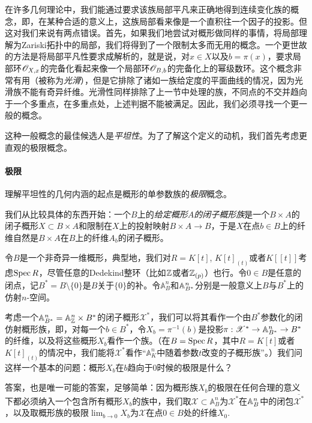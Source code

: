 在许多几何理论中，我们能通过要求该族局部平凡来正确地得到连续变化族的概念，即，在某种合适的意义上，这族局部看来像是一个直积往一个因子的投影。但这对我们来说有两点错误。首先，如果我们\naive 地尝试对概形做同样的事情，将局部理解为Zariski拓扑中的局部，我们将得到了一个限制太多而无用的概念。一个更世故的方法是将局部平凡性要求成解析的，就是说，对$x\in X$以及$b=\pi(x)$，要求局部环$\mathscr{O}_{X,x}$的完备化看起来像一个局部环$\mathscr{O}_{B,b}$的完备化上的幂级数环。这个概念非常有用（被称为\textit{光滑}），但是它排除了诸如一族给定度的平面曲线的情况，因为光滑族不能有奇异纤维。光滑性同样排除了上一节中处理的族，不同点的不交并趋向于一个多重点，在多重点处，上述判据不能被满足。因此，我们必须寻找一个更一般的概念。

这种一般概念的最佳候选人是\textit{平坦性}。为了了解这个定义的动机，我们首先考虑更直观的极限概念。

\paragraph*{极限}
理解平坦性的几何内涵的起点是概形的单参数族的\textit{极限}概念。

我们从比较具体的东西开始：一个$B$上的\textit{给定概形$A$的闭子概形族}是一个$B\times A$的闭子概形$X\subset B\times A$和限制在$X$上的投射映射$B\times A\to B$，于是$X$在点$b\in B$上的纤维自然是$B\times A$在$B$上的纤维$A_b$的闭子概形。

令$B$是一个非奇异一维概形，典型地，我们对$R=K[t]$, $K[t]_{(t)}$或者$K[\![t]\!]$考虑$\operatorname{Spec} R$，尽管任意的Dedekind整环（比如$\mathbb{Z}$或者$\mathbb{Z}_{(p)}$）也行。令$0\in B$是任意的闭点，记$B^*=B\setminus \{0\}$是$B$关于$\{0\}$的补。令$\mathbb{A}_B^n$和$\mathbb{A}_{B^*}^n$分别是一般意义上$B$与$B^*$上的仿射$n$-空间。

考虑一个$\mathbb{A}_{B^*}^n=\mathbb{A}_{\mathbb{Z}}^n\times B^*$的闭子概形$\mathscr{X}^*$，我们可以将其看作一个由$B^*$参数化的闭仿射概形族，即，对每一个$b\in B^*$，令$X_b=\pi^{-1}(b)$是投影$\pi:\mathscr{X}^*\to \mathbb{A}_{B^*}^n\to B^*$的纤维，以及将这些概形$X_b$看作一个族。（在$B=\operatorname{Spec} R$，其中$R=K[t]$或者$K[t]_{(t)}$的情况中，我们能将$\mathscr{X}^*$看作“$\mathbb{A}_K^n$中随着参数$t$改变的子概形族”。）我们问这样一个基本的问题：概形$X_b$在$b$趋向于$0$时候的极限是什么？


答案，也是唯一可能的答案，足够简单：因为概形族$X_b$的极限在任何合理的意义下都必须纳入一个包含所有概形$X_b$的族中，我们取$\mathscr{X}\subset \mathbb{A}_B^n$为$\mathscr{X}^*$在$\mathbb{A}_B^n$中的闭包$\overline{\mathscr{X}^*}$，以及取概形族的极限$\lim_{b\to 0}X_b$为$\mathscr{X}$在点$0\in B$处的纤维$X_0$.

